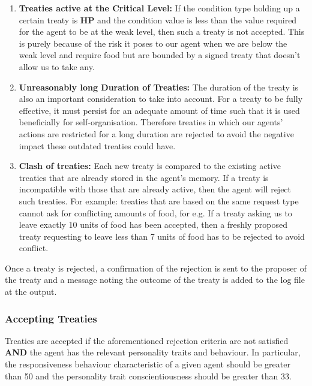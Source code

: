 \begin{enumerate}
    \item 
    \textbf{Treaties active at the Critical Level:} \newline
    If the condition type holding up a certain treaty is \textbf{HP} and the condition value is less than the value required for the agent to be at the weak level, then such a treaty is not accepted. This is purely because of the risk it poses to our agent when we are below the weak level and require food but are bounded by a signed treaty that doesn't allow us to take any.
    
    \item 
    \textbf{Unreasonably long Duration of Treaties:} \newline
    The duration of the treaty is also an important consideration to take into account. For a treaty to be fully effective, it must persist for an adequate amount of time such that it is used beneficially for self-organisation. Therefore treaties in which our agents' actions are restricted for a long duration are rejected to avoid the negative impact these outdated treaties could have. 
    
    \item 
    \textbf{Clash of treaties:} \newline
    Each new treaty is compared to the existing active treaties that are already stored in the agent's memory. If a treaty is incompatible with those that are already active, then the agent will reject such treaties. For example: treaties that are based on the same request type cannot ask for conflicting amounts of food, for e.g. If a treaty asking us to leave exactly 10 units of food has been accepted, then a freshly proposed treaty requesting to leave less than 7 units of food has to be rejected to avoid conflict.
\end{enumerate}

Once a treaty is rejected, a confirmation of the rejection is sent to the proposer of the treaty and a message noting the outcome of the treaty is added to the log file at the output.

\subsubsection{Accepting Treaties}
\label{subsec: Accepting Treaties}

Treaties are accepted if the aforementioned rejection criteria are not satisfied \textbf{AND} the agent has the relevant personality traits and behaviour. In particular, the responsiveness behaviour characteristic of a given agent should be greater than 50 and the personality trait conscientiousness should be greater than 33. 
\newline

